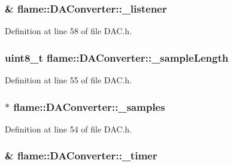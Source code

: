 \hypertarget{classflame_1_1_d_a_converter_a5ef3241975593e467838c730857772f4}{
\subsubsection[{\-\_\-listener}]{\& flame\-::\-D\-A\-Converter\-::\-\_\-listener\hspace{0.3cm}{\ttfamily [protected]}}}\label{classflame_1_1_d_a_converter_a5ef3241975593e467838c730857772f4}


Definition at line 58 of file D\-A\-C.\-h.

\hypertarget{classflame_1_1_d_a_converter_a97893edc430924497ee399b9223e4061}{
\subsubsection[{\-\_\-sample\-Length}]{\setlength{\rightskip}{0pt plus 5cm}uint8\-\_\-t flame\-::\-D\-A\-Converter\-::\-\_\-sample\-Length\hspace{0.3cm}{\ttfamily [protected]}}}\label{classflame_1_1_d_a_converter_a97893edc430924497ee399b9223e4061}


Definition at line 55 of file D\-A\-C.\-h.

\hypertarget{classflame_1_1_d_a_converter_a26a86c298bf06bfc532f1b7cdaad6a75}{
\subsubsection[{\-\_\-samples}]{$\ast$ flame\-::\-D\-A\-Converter\-::\-\_\-samples\hspace{0.3cm}{\ttfamily [protected]}}}\label{classflame_1_1_d_a_converter_a26a86c298bf06bfc532f1b7cdaad6a75}


Definition at line 54 of file D\-A\-C.\-h.

\hypertarget{classflame_1_1_d_a_converter_a70829abb271ec51a212d558c9087d8c5}{
\subsubsection[{\-\_\-timer}]{\& flame\-::\-D\-A\-Converter\-::\-\_\-timer\hspace{0.3cm}{\ttfamily [protected]}}}\label{classflame_1_1_d_a_converter_a70829abb271ec51a212d558c9087d8c5}



